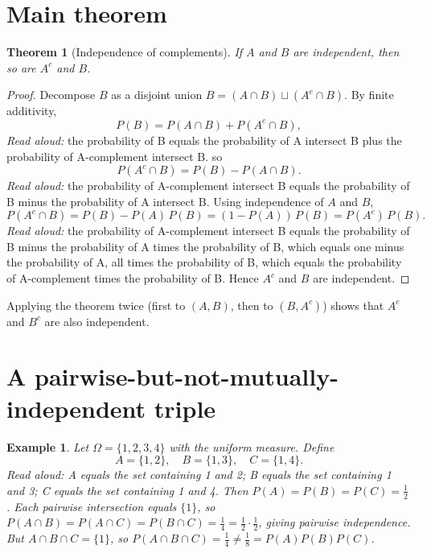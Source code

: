 \documentclass[11pt]{article}
\newtheorem{theorem}{Theorem}
\newtheorem{example}{Example}
\begin{document}
\section{Main theorem}

\begin{theorem}[Independence of complements]
If $A$ and $B$ are independent, then so are $A^c$ and $B$.
\end{theorem}

\begin{proof}
Decompose $B$ as a disjoint union $B = (A \cap B) \sqcup (A^c \cap B)$. By finite additivity,
\[
P(B) = P(A \cap B) + P(A^c \cap B),
\]
\emph{Read aloud:} the probability of B equals the probability of A intersect B plus the probability of A-complement intersect B.
so
\[
P(A^c \cap B) = P(B) - P(A \cap B).
\]
\emph{Read aloud:} the probability of A-complement intersect B equals the probability of B minus the probability of A intersect B.
Using independence of $A$ and $B$,
\[
P(A^c \cap B) = P(B) - P(A)\, P(B) = (1 - P(A))\, P(B) = P(A^c)\, P(B).
\]
\emph{Read aloud:} the probability of A-complement intersect B equals the probability of B minus the probability of A times the probability of B, which equals one minus the probability of A, all times the probability of B, which equals the probability of A-complement times the probability of B.
Hence $A^c$ and $B$ are independent.
\end{proof}

Applying the theorem twice (first to $(A,B)$, then to $(B, A^c)$) shows that $A^c$ and $B^c$ are also independent.

\section{A pairwise-but-not-mutually-independent triple}

\begin{example}
Let $\Omega = \{1,2,3,4\}$ with the uniform measure. Define
\[
A = \{1,2\}, \quad B = \{1,3\}, \quad C = \{1,4\}.
\]
\emph{Read aloud:} A equals the set containing 1 and 2; B equals the set containing 1 and 3; C equals the set containing 1 and 4.
Then $P(A) = P(B) = P(C) = \tfrac{1}{2}$. Each pairwise intersection equals $\{1\}$, so
$P(A \cap B) = P(A \cap C) = P(B \cap C) = \tfrac{1}{4} = \tfrac{1}{2} \cdot \tfrac{1}{2}$, giving pairwise independence.
But $A \cap B \cap C = \{1\}$, so $P(A \cap B \cap C) = \tfrac{1}{4} \neq \tfrac{1}{8} = P(A) P(B) P(C)$.
\end{example}
\end{document}
